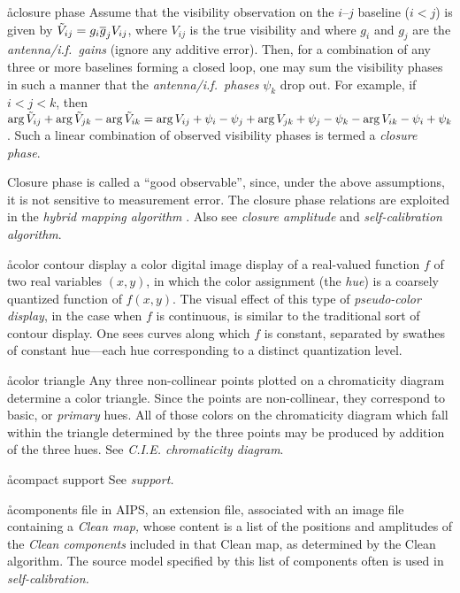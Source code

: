 \aa{closure phase}
Assume that the visibility observation on the $i$--$j$ baseline
($i<j$) is given by
$\tilde V_{ij}=g_i\overline g_jV_{ij}$, where $V_{ij}$ is the true
visibility and where $g_i$ and $g_j$ are the {\it antenna/i.f.\ gains}
(ignore any additive error).
Then, for a combination of any three or more baselines
forming a closed loop, one may sum the visibility phases
in such a manner that the {\it antenna/i.f.\ phases} $\psi_k$ drop out.
For example, if $i<j<k$, then
$\arg \s V_{ij}+\arg \s V_{jk}-\arg \s V_{ik}=
\arg V_{ij}+\psi_i-\psi_j+\arg V_{jk}+\psi_j-
\psi_k-\arg V_{ik}-\psi_i+\psi_k$.
Such a linear combination of observed visibility phases
is termed a {\it closure phase}.
\par
Closure phase is called a ``good observable'', since,
under the above assumptions, it is not sensitive to measurement error.
The closure phase relations are exploited in the
{\it hybrid mapping algorithm} \qv.
Also see {\it closure amplitude} and {\it self-calibration algorithm}.

\aa{color contour display}
a color digital image display of a real-valued function $f$
of two real variables $(x,y)$,
in which the color assignment (the {\it hue}\/)
is a coarsely quantized function of $f(x,y)$.
The visual effect of this type of {\it pseudo-color display},
in the case when $f$ is continuous,
is similar to the traditional sort of contour display.
One sees curves along which $f$ is constant, separated by
swathes of constant hue---each hue corresponding to a distinct quantization
level.

\aa{color triangle}
Any three non-collinear points plotted on a chromaticity diagram
determine a color triangle.
Since the points are non-collinear, they correspond to
basic, or {\it primary} hues.
All of those colors on the chromaticity diagram
which fall within the triangle determined by the three points
may be produced by addition of the three hues.
See {\it C.I.E. chromaticity diagram}.

\aa{compact support} See {\it support.}

\aa{components file}
in AIPS, an extension file, associated with an image file
containing a {\it Clean map,} whose content is a list of
the positions and amplitudes
of the {\it Clean components} included in that Clean map,
as determined by the Clean algorithm.
The source model specified by this list of components
often is used in {\it self-calibration.}


